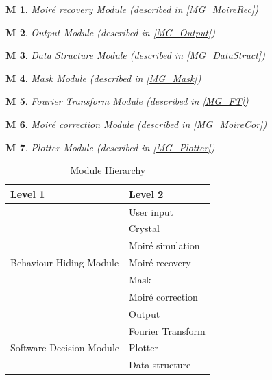 \documentclass[12pt, titlepage]{article}
\newtheorem{M}{M}
\begin{document}
\begin{M}\normalfont Moir{\'e} recovery Module (described in \cref{MG_MoireRec})
\label{M_MoireRec}
\end{M}

\begin{M}\normalfont Output Module (described in \cref{MG_Output})
\label{M_Output}
\end{M}

\begin{M}\normalfont Data Structure Module (described in \cref{MG_DataStruct})
\label{M_DataStruct}
\end{M}

\begin{M}\normalfont Mask Module (described in \cref{MG_Mask})
\label{M_Mask}
\end{M}

\begin{M}\normalfont Fourier Transform Module (described in \cref{MG_FT})
\label{M_FT}
\end{M}

\begin{M}\normalfont Moir{\'e} correction Module (described in \cref{MG_MoireCor})
\label{M_MoireCor}
\end{M}

\begin{M}\normalfont Plotter Module (described in \cref{MG_Plotter})
\label{M_Plotter}
\end{M}

\begin{table}[H]
\centering
\begin{tabular}{p{} p{}}
\toprule
\textbf{Level 1} & \textbf{Level 2}\\
\midrule

\multirow{7}{0.3\textwidth}{Behaviour-Hiding Module} & User input\\
& Crystal \\
& Moir{\'e} simulation \\
& Moir{\'e} recovery \\
& Mask \\
& Moir{\'e} correction\\
& Output \\
\midrule

\multirow{3}{0.3\textwidth}{Software Decision Module} & Fourier Transform \\
& Plotter \\
& Data structure \\
\bottomrule

\end{tabular}
\caption{Module Hierarchy}
\label{TblMH}
\end{table}
\end{document}
